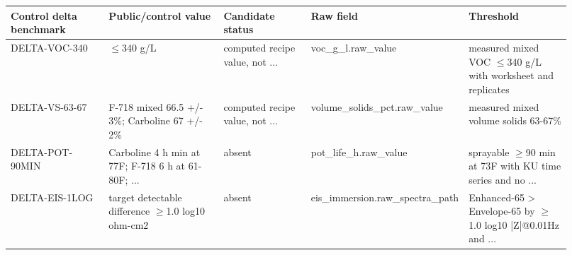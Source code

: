 \documentclass[10pt]{article}
\begin{document}
{\scriptsize\begin{longtable}{@{}p{0.18\linewidth} p{0.21\linewidth} p{0.16\linewidth} p{0.18\linewidth} p{0.19\linewidth}@{}}\toprule \textbf{Control delta benchmark} & \textbf{Public/control value} & \textbf{Candidate status} & \textbf{Raw field} & \textbf{Threshold} \\ \midrule DELTA-VOC-340 & $\leq$340 g/L & computed recipe value, not ... & voc\_g\_l.raw\_value & measured mixed VOC $\leq$340 g/L with worksheet and replicates \\ DELTA-VS-63-67 & F-718 mixed 66.5 +/- 3\%; Carboline 67 +/- 2\% & computed recipe value, not ... & volume\_solids\_pct.raw\_value & measured mixed volume solids 63-67\% \\ DELTA-POT-90MIN & Carboline 4 h min at 77F; F-718 6 h at 61-80F; ... & absent & pot\_life\_h.raw\_value & sprayable $\geq$90 min at 73F with KU time series and no ... \\ DELTA-EIS-1LOG & target detectable difference $\geq$1.0 log10 ohm-cm2 & absent & eis\_immersion.raw\_spectra\_path & Enhanced-65 > Envelope-65 by $\geq$1.0 log10 |Z|@0.01Hz and ... \\ \bottomrule\end{longtable}}
\end{document}
